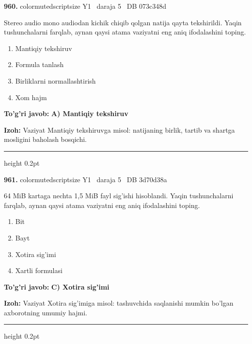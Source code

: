 \documentclass[10pt,a4paper,oneside]{article}
\begin{document}
\noindent\textbf{\color{ink}960.}  {color{muted}scriptsize Y1 \textbullet\ daraja 5 \textbullet\ DB 073c348d}
\par
Stereo audio mono audiodan kichik chiqib qolgan natija qayta tekshirildi. Yaqin tushunchalarni farqlab, aynan qaysi atama vaziyatni eng aniq ifodalashini toping.
\begin{enumerate}[label=\Alph*),leftmargin=9mm]
\item Mantiqiy tekshiruv
\item Formula tanlash
\item Birliklarni normallashtirish
\item Xom hajm
\end{enumerate}
\begin{tcolorbox}[enhanced,breakable,colback=teal!4,colframe=teal!50!black,boxrule=0.5pt,arc=1.1mm,left=3mm,right=3mm,top=1.7mm,bottom=1.7mm,before skip=2mm,after skip=2mm]
\textbf{\color{teal}To'g'ri javob:} \textbf{A) Mantiqiy tekshiruv}
\par\smallskip
\textbf{Izoh:} Vaziyat Mantiqiy tekshiruvga misol: natijaning birlik, tartib va shartga mosligini baholash bosqichi.
\end{tcolorbox}
\vspace{2mm}\hrule height 0.2pt \vspace{3mm}

\noindent\textbf{\color{ink}961.}  {color{muted}scriptsize Y1 \textbullet\ daraja 5 \textbullet\ DB 3d70d38a}
\par
64 MiB kartaga nechta 1,5 MiB fayl sig'ishi hisoblandi. Yaqin tushunchalarni farqlab, aynan qaysi atama vaziyatni eng aniq ifodalashini toping.
\begin{enumerate}[label=\Alph*),leftmargin=9mm]
\item Bit
\item Bayt
\item Xotira sig'imi
\item Xartli formulasi
\end{enumerate}
\begin{tcolorbox}[enhanced,breakable,colback=teal!4,colframe=teal!50!black,boxrule=0.5pt,arc=1.1mm,left=3mm,right=3mm,top=1.7mm,bottom=1.7mm,before skip=2mm,after skip=2mm]
\textbf{\color{teal}To'g'ri javob:} \textbf{C) Xotira sig'imi}
\par\smallskip
\textbf{Izoh:} Vaziyat Xotira sig'imiga misol: tashuvchida saqlanishi mumkin bo'lgan axborotning umumiy hajmi.
\end{tcolorbox}
\vspace{2mm}\hrule height 0.2pt \vspace{3mm}
\end{document}
